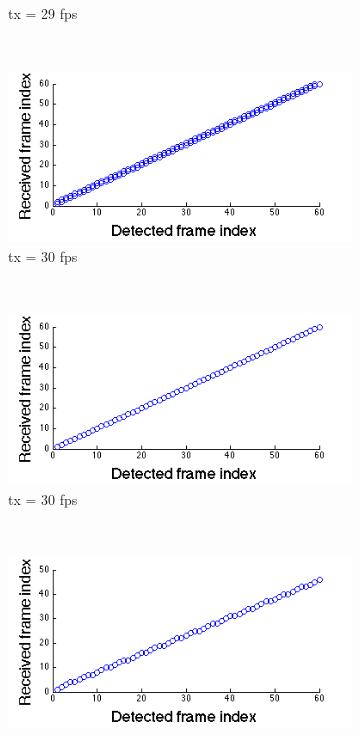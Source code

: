 \begin{figure}[!htb]
\begin{subfigure}[h]{0.25\textwidth}
      \caption{tx = 29 fps} \label{fig:tx_29fps}
   \end{subfigure}%
   ~
   \begin{subfigure}[h]{0.25\textwidth}
      \includegraphics[width=\textwidth]{fig/tx_30_2.png}
      \caption{tx = 30 fps} \label{fig:tx_30fps_2}
   \end{subfigure}%
   \\
   \begin{subfigure}[h]{0.25\textwidth}
      \includegraphics[width=\textwidth]{fig/tx_30.png}
      \caption{tx = 30 fps} \label{fig:tx_30fps}
   \end{subfigure}%
   ~   
   \begin{subfigure}[h]{0.25\textwidth}
      \includegraphics[width=\textwidth]{fig/tx_40.png}

\end{subfigure}
\end{figure}
